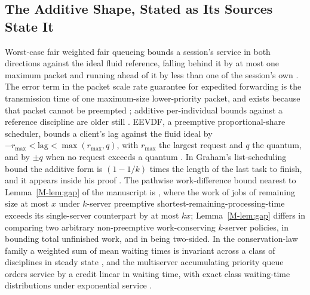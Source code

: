 \documentclass[mathematics,supfile,submit,moreauthors]{Definitions/mdpi}
\begin{document}
\subsection{The Additive Shape, Stated as Its Sources State It}

Worst-case fair weighted fair queueing bounds a session's service in both directions
against the ideal fluid reference, falling behind it by at most one maximum packet and
running ahead of it by less than one of the session's own \cite{bennett1996wf2q}. The
error term in the packet scale rate guarantee for expedited forwarding is the
transmission time of one maximum-size lower-priority packet, and exists because that
packet cannot be preempted \cite{bennett2002psrg}; additive per-individual bounds
against a reference discipline are older still \cite{parekh1993gps,parekh1994gps}.
EEVDF, a preemptive proportional-share scheduler, bounds a client's lag against the
fluid ideal by $-r_{\max} < \mathrm{lag} < \max(r_{\max}, q)$, with $r_{\max}$ the
largest request and $q$ the quantum, and by $\pm q$ when no request exceeds a quantum
\cite{stoica1995eevdf}. In Graham's list-scheduling bound the additive form is
$(1-1/k)$ times the length of the last task to finish, and it appears inside his proof
\cite{graham1969bounds}. The pathwise work-difference bound nearest to Lemma~\ref*{M-lem:gap} of the
manuscript is \cite[Lemma~2]{grosof2018srpt}, where the work of jobs of remaining size
at most $x$ under $k$-server preemptive shortest-remaining-processing-time exceeds its
single-server counterpart by at most $kx$; Lemma~\ref*{M-lem:gap} differs in comparing two arbitrary
non-preemptive work-conserving $k$-server policies, in bounding total unfinished work,
and in being two-sided. In the conservation-law family a weighted sum of mean waiting
times is invariant across a class of disciplines in steady state
\cite{kleinrock1965conservation}, and the multiserver accumulating priority queue orders
service by a credit linear in waiting time, with exact class waiting-time distributions
under exponential service \cite{sharif2014mapq,li2016mapq}.
\end{document}
